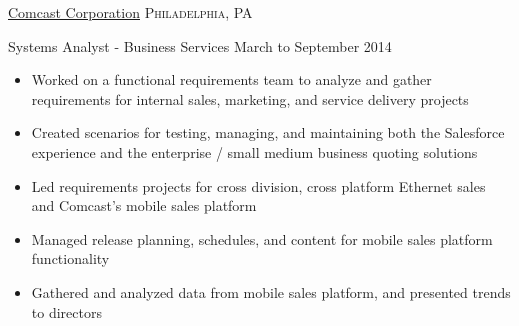 \documentclass[10pt,letterpaper]{article}
\begin{document}
\headedsection  %
  {\href{http://corporate.comcast.com//}{Comcast Corporation}}
  {\textsc{Philadelphia, PA}} {%
  \headedsubsection
    {Systems Analyst - Business Services}
    {March to September 2014}
    {\begin{itemize}
    \item Worked on a functional requirements team to analyze and gather requirements for internal sales, marketing, and service delivery projects
    \item Created scenarios for testing, managing, and maintaining both the Salesforce experience and the enterprise / small medium business quoting solutions
    \item Led requirements projects for cross division, cross platform Ethernet sales and Comcast's mobile sales platform
    \item Managed release planning, schedules, and content for mobile sales platform functionality
    \item Gathered and analyzed data from mobile sales platform, and presented trends to directors
    \end{itemize}}
}
\end{document}
